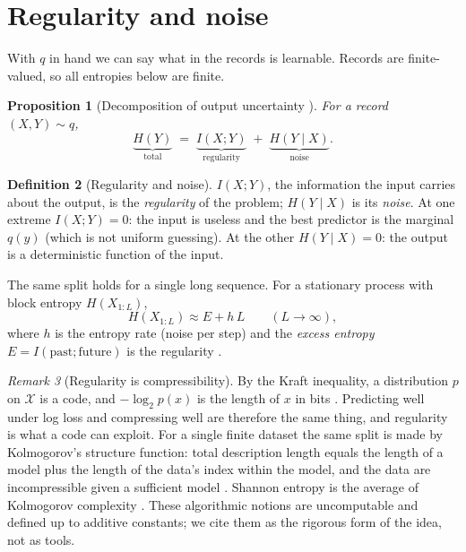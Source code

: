 \documentclass[11pt]{article}
\theoremstyle{definition}
\newtheorem{definition}{Definition}[section]
\theoremstyle{plain}
\newtheorem{proposition}[definition]{Proposition}
\theoremstyle{remark}
\newtheorem{remark}[definition]{Remark}
\newcommand{\X}{\mathcal{X}}
\begin{document}
\section{Regularity and noise}\label{sec:regularity}

With $q$ in hand we can say what in the records is learnable. Records
are finite-valued, so all entropies below are finite.

\begin{proposition}[Decomposition of output uncertainty \cite{cover2006}]
For a record $(X,Y)\sim q$,
\[
\underbrace{H(Y)}_{\text{total}} \;=\; \underbrace{I(X;Y)}_{\text{regularity}} \;+\; \underbrace{H(Y\mid X)}_{\text{noise}} .
\]
\end{proposition}

\begin{definition}[Regularity and noise]
$I(X;Y)$, the information the input carries about the output, is the
\emph{regularity} of the problem; $H(Y\mid X)$ is its \emph{noise}. At
one extreme $I(X;Y)=0$: the input is useless and the best predictor is
the marginal $q(y)$ (which is not uniform guessing). At the other
$H(Y\mid X)=0$: the output is a deterministic function of the input.
\end{definition}

The same split holds for a single long sequence. For a stationary
process with block entropy $H(X_{1:L})$,
\[
H(X_{1:L}) \approx E + h\,L \qquad (L\to\infty),
\]
where $h$ is the entropy rate (noise per step) and the \emph{excess
entropy} $E = I(\text{past};\text{future})$ is the regularity
\cite{crutchfield2003,bialek2001}.

\begin{remark}[Regularity is compressibility]
By the Kraft inequality, a distribution $p$ on $\X$ is a code, and
$-\log_2 p(x)$ is the length of $x$ in bits \cite{cover2006}. Predicting
well under log loss and compressing well are therefore the same
thing, and regularity is what a code can exploit. For a single finite
dataset the same split is made by Kolmogorov's structure function:
total description length equals the length of a model plus the length
of the data's index within the model, and the data are incompressible
given a sufficient model \cite{gacs2001,vereshchagin2004}. Shannon
entropy is the average of Kolmogorov complexity
\cite{grunwald2003}. These algorithmic notions are uncomputable and
defined up to additive constants; we cite them as the rigorous form of
the idea, not as tools.
\end{remark}
\end{document}
